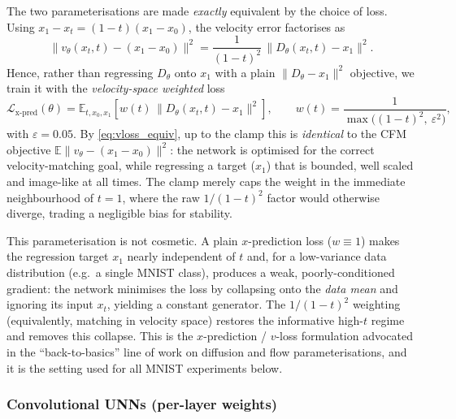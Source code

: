The two parameterisations are made \emph{exactly} equivalent by the choice of
loss. Using $x_1 - x_t = (1-t)(x_1 - x_0)$, the velocity error factorises as
\begin{equation}
    \bigl\| v_\theta(x_t,t) - (x_1-x_0) \bigr\|^2
    = \frac{1}{(1-t)^2}\,\bigl\| D_\theta(x_t,t) - x_1 \bigr\|^2 .
    \label{eq:vloss_equiv}
\end{equation}
Hence, rather than regressing $D_\theta$ onto $x_1$ with a plain
$\|D_\theta - x_1\|^2$ objective, we train it with the \emph{velocity-space
weighted} loss
\begin{equation}
    \mathcal{L}_{\text{x-pred}}(\theta)
    = \mathbb{E}_{t, x_0, x_1}\!\left[
        w(t)\,\bigl\| D_\theta(x_t,t) - x_1 \bigr\|^2
    \right],
    \qquad
    w(t) = \frac{1}{\max\!\bigl((1-t)^2,\ \varepsilon^2\bigr)},
    \label{eq:xpred_loss}
\end{equation}
with $\varepsilon = 0.05$. By \eqref{eq:vloss_equiv}, up to the clamp this is
\emph{identical} to the CFM objective $\mathbb{E}\|v_\theta-(x_1-x_0)\|^2$: the
network is optimised for the correct velocity-matching goal, while regressing a
target ($x_1$) that is bounded, well scaled and image-like at all times. The
clamp merely caps the weight in the immediate neighbourhood of $t=1$, where the
raw $1/(1-t)^2$ factor would otherwise diverge, trading a negligible bias for
stability.

This parameterisation is not cosmetic. A plain $x$-prediction loss
($w \equiv 1$) makes the regression target $x_1$ nearly independent of $t$ and,
for a low-variance data distribution (e.g.\ a single MNIST class), produces a
weak, poorly-conditioned gradient: the network minimises the loss by collapsing
onto the \emph{data mean} and ignoring its input $x_t$, yielding a constant
generator. The $1/(1-t)^2$ weighting (equivalently, matching in velocity space)
restores the informative high-$t$ regime and removes this collapse. This is the
$x$-prediction / $v$-loss formulation advocated in the ``back-to-basics'' line of
work on diffusion and flow parameterisations, and it is the setting used for all
MNIST experiments below.



\subsubsection{Convolutional UNNs (per-layer weights)}

